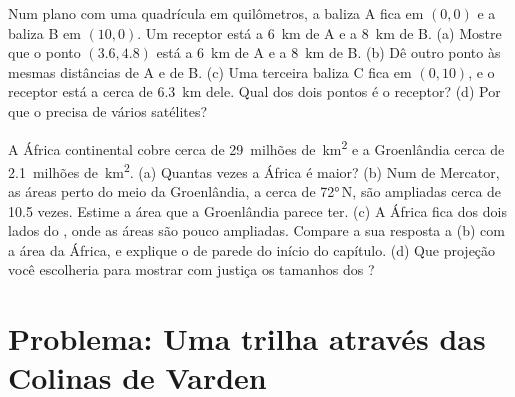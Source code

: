 \begin{exercise}[$\star\star\star$]\label{exo:g9:maps-of-the-earth:11}
Num  plano com uma quadrícula em quilômetros, a baliza A fica em
$(0, 0)$ e a baliza B em $(10, 0)$. Um receptor está a \qty{6}{km} de A e a
\qty{8}{km} de B. (a) Mostre que o ponto $(3.6, 4.8)$ está a \qty{6}{km}
de A e a \qty{8}{km} de B. (b) Dê outro ponto às mesmas distâncias de A e
de B. (c) Uma terceira baliza C fica em $(0, 10)$, e o receptor está a cerca
de \qty{6.3}{km} dele. Qual dos dois pontos é o receptor? (d) Por que o
 precisa de vários satélites?
\end{exercise}

\begin{exercise}[$\star\star\star$]\label{exo:g9:maps-of-the-earth:12}
A África continental cobre cerca de 29~milhões de~\unit{km^2} e a
Groenlândia cerca de 2.1~milhões de~\unit{km^2}. (a) Quantas vezes a
África é maior? (b) Num  de Mercator, as áreas perto do meio da
Groenlândia, a cerca de \ang{72}\,N, são ampliadas cerca de 10.5 vezes.
Estime a área que a Groenlândia parece ter. (c) A África fica dos dois
lados do , onde as áreas são pouco ampliadas. Compare a sua
resposta a (b) com a área da África, e explique o  de parede do
início do capítulo. (d) Que projeção você escolheria para mostrar com
justiça os tamanhos dos ?
\end{exercise}

\section{Problema: Uma trilha através das Colinas de Varden}

